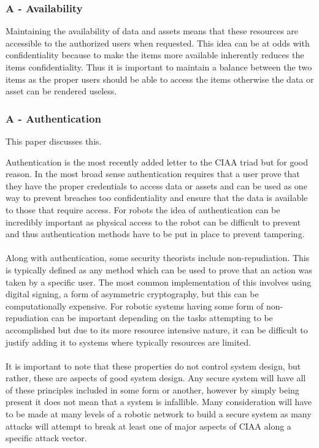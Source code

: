 \subsubsection{A - Availability}

Maintaining the availability of data and assets means that these resources are accessible to the authorized users when requested. This idea can be at odds with confidentiality because to make the items more available inherently reduces the items confidentiality. Thus it is important to maintain a balance between the two items as the proper users should be able to access the items otherwise the data or asset can be rendered useless.  

\subsubsection{A - Authentication}

This \cite{article:Martin} paper discusses this.

Authentication is the most recently added letter to the CIAA triad but for good reason. In the most broad sense authentication requires that a user prove that they have the proper credentials to access data or assets and can be used as one way to prevent breaches too confidentiality and ensure that the data is available to those that require access. For robots the idea of authentication can be incredibly important as physical access to the robot can be difficult to prevent and thus authentication methods have to be put in place to prevent tampering.
\\\\
Along with authentication, some security theorists include non-repudiation. This is typically defined as any method which can be used to prove that an action was taken by a specific user. The most common implementation of this involves using digital signing, a form of asymmetric cryptography, but this can be computationally expensive. For robotic systems having some form of non-repudiation can be important depending on the tasks attempting to be accomplished but due to its more resource intensive nature, it can be difficult to justify adding it to systems where typically resources are limited. 
\\\\
It is important to note that these properties do not control system design, but rather, these are aspects of good system design. Any secure system will have all of these principles included in some form or another, however by simply being present it does not mean that a system is infallible. Many consideration will have to be made at many levels of a robotic network to build a secure system as many attacks will attempt to break at least one of major aspects of CIAA along a specific attack vector.

